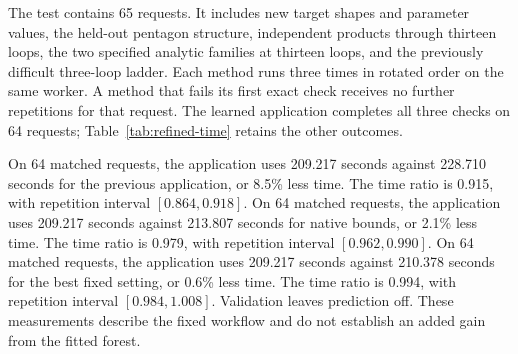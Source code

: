 The test contains 65 requests. It includes new target shapes and parameter values, the held-out pentagon structure, independent products through thirteen loops, the two specified analytic families at thirteen loops, and the previously difficult three-loop ladder. Each method runs three times in rotated order on the same worker. A method that fails its first exact check receives no further repetitions for that request. The learned application completes all three checks on 64 requests; Table~\ref{tab:refined-time} retains the other outcomes.

On 64 matched requests, the application uses 209.217 seconds against 228.710 seconds for the previous application, or 8.5\% less time. The time ratio is 0.915, with repetition interval $[0.864,0.918]$. On 64 matched requests, the application uses 209.217 seconds against 213.807 seconds for native bounds, or 2.1\% less time. The time ratio is 0.979, with repetition interval $[0.962,0.990]$. On 64 matched requests, the application uses 209.217 seconds against 210.378 seconds for the best fixed setting, or 0.6\% less time. The time ratio is 0.994, with repetition interval $[0.984,1.008]$. Validation leaves prediction off. These measurements describe the fixed workflow and do not establish an added gain from the fitted forest.

